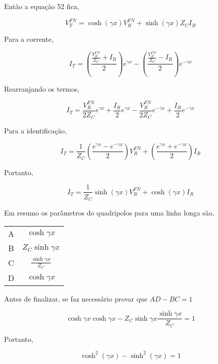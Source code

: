 \documentclass[a4paper, 10pt]{article}
\begin{document}
Então a equação 52 fica,

\begin{equation}
V_T^{FN} = \cosh{(\gamma x)} V_R^{FN} + \sinh{(\gamma x)}  Z_C I_R 
\end{equation}

Para a corrente,

\begin{equation}
I_T = \left( \frac{\frac{V_R^{FN}}{Z_C} + I_R}{2}\right) e^{\gamma x} - \left( \frac{\frac{V_R^{FN}}{Z_C} - I_R}{2}\right) e^{-\gamma x} 
\end{equation}

Rearranjando os termos,

\begin{equation}
I_T = \frac{V_R^{FN}}{2 Z_C} e^{\gamma x} + \frac{I_R}{2} e^{\gamma x} - \frac{V_R^{FN}}{2 Z_C} e^{-\gamma x} + \frac{I_R}{2} e^{-\gamma x}
\end{equation}

Para a identificação,

\begin{equation}
I_T = \frac{1}{Z_C} \left( \frac{e^{\gamma x} - e^{-\gamma x}}{2}\right) V_R^{FN} + \left( \frac{e^{\gamma x} + e^{-\gamma x}}{2}\right) I_R
\end{equation}

Portanto,

\begin{equation}
I_T = \frac{1}{Z_C} \sinh{(\gamma x)}  V_R^{FN} + \cosh{(\gamma x)} I_R
\end{equation}

Em resumo os parâmetros do quadripolos para uma linha longa são,

\renewcommand{\arraystretch}{1.5}
\begin{center}
\begin{tabular}{c||c}
	A & $\cosh{\gamma x}$ \\
    B & $Z_C \sinh{\gamma x}$ \\
    C & $\frac{\sinh{\gamma x}}{Z_C}$ \\
    D & $\cosh{\gamma x}$ \\
\end{tabular}
\end{center}

Antes de finalizar, se faz necessário provar que $A D - B C = 1$

\begin{equation}
 \cosh{\gamma x} \cosh{\gamma x} - Z_C \sinh{\gamma x} \frac{\sinh{\gamma x}}{Z_C} = 1
\end{equation}

Portanto,

\begin{equation}
 \cosh^2{(\gamma x)} - \sinh^2{(\gamma x)} = 1
\end{equation}
\end{document}
